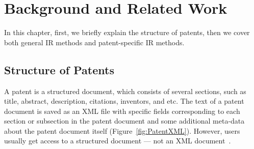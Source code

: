 \chapter{Background and Related Work}
\label{cha:background}
In this chapter, first, we briefly explain the structure of patents, then we cover both general IR methods and patent-specific IR methods.
\section{Structure of Patents}
\label{StructureofPatents}
A patent is a structured document, which consists of several sections, such as title, abstract,
description, citations, inventors, and etc. The text of a patent document is saved
as an XML file with specific fields corresponding to each
section or subsection in the patent document and some additional meta-data about the patent
document itself (Figure~\ref{fig:PatentXML}). However, users usually get access to a structured document --- not an
XML document~\citep{magdy2012toward}.
